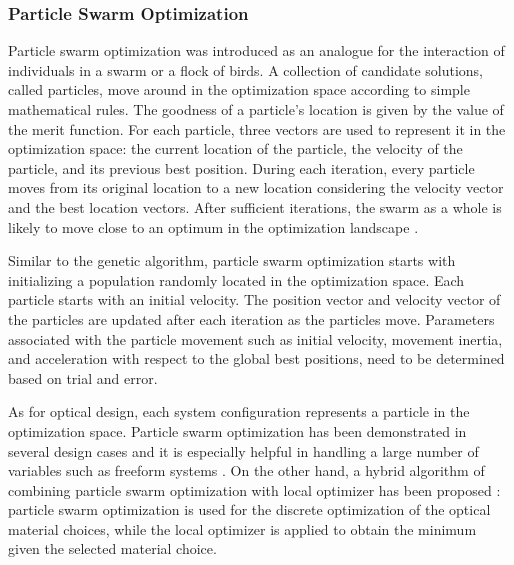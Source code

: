 \subsubsection{Particle Swarm Optimization}
Particle swarm optimization was introduced as an analogue for the interaction of individuals in a swarm or a flock of birds. A collection of candidate solutions, called particles, move around in the optimization space according to simple mathematical rules. The goodness of a particle's location is given by the value of the merit function. For each particle, three vectors are used to represent it in the optimization space: the current location of the particle, the velocity of the particle, and its previous best position. During each iteration, every particle moves from its original location to a new location considering the velocity vector and the best location vectors.  After sufficient iterations, the swarm as a whole is likely to move close to an optimum in the optimization landscape \cite{MenkeParticleSwarm} . 

Similar to the genetic algorithm, particle swarm optimization starts with initializing a population randomly located in the optimization space. Each particle starts with an initial velocity. The position vector and velocity vector of the particles are updated after each iteration as the particles move. Parameters associated with the particle movement such as initial velocity, movement inertia, and acceleration with respect to the global best positions, need to be determined based on trial and error. 

As for optical design, each system configuration represents a particle in the optimization space. Particle swarm optimization has been demonstrated in several design cases and it is especially helpful in handling a large number of variables such as freeform systems \cite{MenkeParticleSwarm}. On the other hand, a hybrid algorithm of combining particle swarm optimization with local optimizer has been proposed \cite{Guo:sParticleSwarm}: particle swarm optimization is used for the discrete optimization of the optical material choices, while the local optimizer is applied to obtain the minimum given the selected material choice.  

